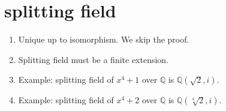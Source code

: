 \documentclass[15pt]{scrartcl}
\newcommand{\Q}{\mathbb{Q}}
\begin{document}
\section{splitting field}
\begin{enumerate}
    \item Unique up to isomorphism. We skip the proof.
    \item Splitting field must be a finite extension.
    \item Example: splitting field of $x^4+1$ over $\Q$ is $\Q(\sqrt{2}, i)$.
    \item Example: splitting field of $x^4+2$ over $\Q$ is $\Q(\sqrt[4]{2}, i)$.
\end{enumerate}
\end{document}
